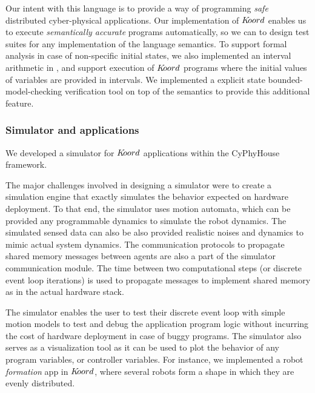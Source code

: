 Our intent with this language is to provide a way of programming \emph{safe} distributed cyber-physical applications. Our \K implementation of $K\kern-2pt oord$ enables us to execute \emph{semantically accurate} programs automatically, so we can to design test suites for any implementation of the language semantics. To support formal analysis in case of non-specific initial states, we also implemented an interval arithmetic in \K, and support execution of $K\kern-2pt oord$ programs where the initial values of variables are provided in intervals. We implemented a explicit state bounded-model-checking verification tool on top of the \K semantics to provide this additional feature. 


\subsubsection{Simulator and applications}

We developed a simulator  for $K\kern-2pt oord$ applications within the CyPhyHouse framework. 

The major challenges involved in designing a simulator were to create a simulation engine that exactly simulates the behavior expected on hardware deployment. To that end, the simulator uses motion automata, which can be provided any programmable dynamics to simulate the robot dynamics. The simulated sensed data can also be also provided realistic noises and dynamics to mimic actual system dynamics. The communication protocols to propagate shared memory messages between agents are also a part of the simulator communication module. The time between two computational steps (or discrete event loop iterations) is used to propagate messages to implement shared memory as in the actual hardware stack.

The simulator enables the user to test their discrete event loop with simple motion models to test and debug the application program logic without incurring the cost of hardware deployment in case of buggy programs. The simulator also serves as a visualization tool as it can be used to plot the behavior of any program variables, or controller variables. For instance, we implemented a robot \emph{formation} app in $K\kern-2pt oord$, where several robots form a shape in which they are evenly distributed.


